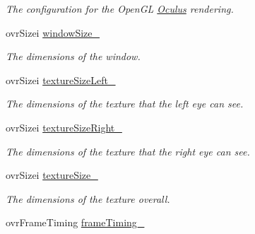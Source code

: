 \begin{DoxyCompactItemize}
\begin{DoxyCompactList}\small\item\em The configuration for the Open\+G\+L \hyperlink{classOculus}{Oculus} rendering. \end{DoxyCompactList}\item 
\hypertarget{classOculus_a944e263e7aee6b568b69211896e05365}{}ovr\+Sizei \hyperlink{classOculus_a944e263e7aee6b568b69211896e05365}{window\+Size\+\_\+}\label{classOculus_a944e263e7aee6b568b69211896e05365}

\begin{DoxyCompactList}\small\item\em The dimensions of the window. \end{DoxyCompactList}\item 
\hypertarget{classOculus_a33ff393c9f149ea6e559629c6de3fb9c}{}ovr\+Sizei \hyperlink{classOculus_a33ff393c9f149ea6e559629c6de3fb9c}{texture\+Size\+Left\+\_\+}\label{classOculus_a33ff393c9f149ea6e559629c6de3fb9c}

\begin{DoxyCompactList}\small\item\em The dimensions of the texture that the left eye can see. \end{DoxyCompactList}\item 
\hypertarget{classOculus_a742ac672ac7679c1d6b03a5fe2595f96}{}ovr\+Sizei \hyperlink{classOculus_a742ac672ac7679c1d6b03a5fe2595f96}{texture\+Size\+Right\+\_\+}\label{classOculus_a742ac672ac7679c1d6b03a5fe2595f96}

\begin{DoxyCompactList}\small\item\em The dimensions of the texture that the right eye can see. \end{DoxyCompactList}\item 
\hypertarget{classOculus_a079b9f2a9887330a4001e42cac663a18}{}ovr\+Sizei \hyperlink{classOculus_a079b9f2a9887330a4001e42cac663a18}{texture\+Size\+\_\+}\label{classOculus_a079b9f2a9887330a4001e42cac663a18}

\begin{DoxyCompactList}\small\item\em The dimensions of the texture overall. \end{DoxyCompactList}\item 
\hypertarget{classOculus_a3dc18febcca74ef3ed83276945bb6395}{}ovr\+Frame\+Timing \hyperlink{classOculus_a3dc18febcca74ef3ed83276945bb6395}{frame\+Timing\+\_\+}\label{classOculus_a3dc18febcca74ef3ed83276945bb6395}


\end{DoxyCompactItemize}
